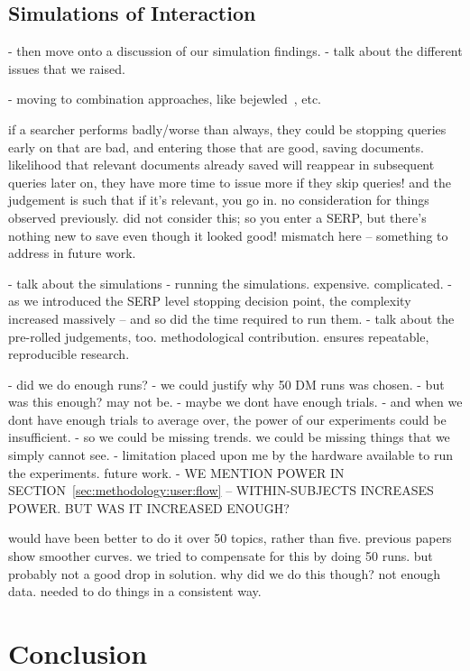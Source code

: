 \subsection{Simulations of Interaction}

- then move onto a discussion of our simulation findings.
- talk about the different issues that we raised.

- moving to combination approaches, like bejewled~\cite{zhang2017bejewled}, etc.

if a searcher performs badly/worse than always, they could be stopping queries early on that are bad, and entering those that are good, saving documents. likelihood that relevant documents already saved will reappear in subsequent queries later on, they have more time to issue more if they skip queries! and the judgement is such that if it's relevant, you go in. no consideration for things observed previously. did not consider this; so you enter a SERP, but there's nothing new to save even though it looked good! mismatch here -- something to address in future work.

- talk about the simulations
    - running the simulations. expensive. complicated.
    - as we introduced the SERP level stopping decision point, the complexity increased massively -- and so did the time required to run them.
    - talk about the pre-rolled judgements, too. methodological contribution. ensures repeatable, reproducible research.

- did we do enough runs?
    - we could justify why 50 DM runs was chosen.
    - but was this enough? may not be.
    - maybe we dont have enough trials.
    - and when we dont have enough trials to average over, the power of our experiments could be insufficient.
        - so we could be missing trends. we could be missing things that we simply cannot see.
        - limitation placed upon me by the hardware available to run the experiments. future work.
        - WE MENTION POWER IN SECTION~\ref{sec:methodology:user:flow} -- WITHIN-SUBJECTS INCREASES POWER. BUT WAS IT INCREASED ENOUGH?

would have been better to do it over 50 topics, rather than five.
previous papers show smoother curves.
we tried to compensate for this by doing 50 runs.
but probably not a good drop in solution.
why did we do this though? not enough data. needed to do things in a consistent way.


\section{Conclusion}\label{sec:conclusions:conclusion}

